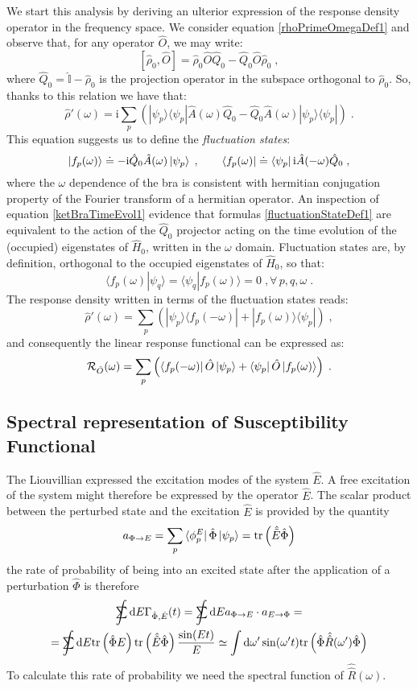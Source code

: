 \documentclass[a4paper]{article}
\newcommand{\dd}{{\rm d}}
\newcommand{\ii}{\mathrm{i}}
\newcommand{\sint}{\mathrlap{\displaystyle\int}
\mathrlap{\textstyle\sum}
\phantom{\mathrlap{\displaystyle
\int}\textstyle\sum}}
\newcommand{\be}{\begin{equation}}
\newcommand{\ee}{\end{equation}}
\newcommand{\qq}{\qquad}
\newcommand{\lb}{\label}
\newcommand{\op}[1]{\hat {#1}}
\newcommand{\sop}[1]{\op{\op {#1}}}
\newcommand{\commutator}[2]{\left[ {#1} , {#2} \right]}
\newcommand{\trace}[1]{\mathrm{tr}\left(#1\right)}
\newcommand{\brket}[2]{\langle  #1 | #2 \rangle} %
\newcommand{\ketbra}[2]{| #1 \rangle \langle #2 |}
\newcommand{\dmnot}{\op{\rho}_0}
\newcommand{\dm}{\op{\rho}}
\newcommand{\hnot}{\op{H}_0}
\newcommand{\identity}{\op{\mathbb I}}
\begin{document}
We start this analysis by deriving an ulterior expression of the response density operator in the frequency space. We consider equation \eqref{rhoPrimeOmegaDef1} and observe that, for any 
operator $\op O$, we may write:  
\be
\commutator{\dmnot}{\op O} = \dmnot \op O \op Q_0 - \op Q_0 \op O \dmnot\;,
\ee
where $\op Q_0= \identity - \dmnot$ is the projection operator in the subspace orthogonal to $\dmnot$. So, thanks to this relation we have that:
\be
\dm'(\omega) = \ii\sum_p\left(\ketbra{\psi_p}{\psi_p}\op A(\omega)\op Q_0 - \op Q_0\op A(\omega)\ketbra{\psi_p}{\psi_p}\right) \;.
\ee
This equation suggests us to define the \emph{fluctuation states}:
\be\lb{fluctuationStateDef1}
\ket{f_p(\omega)} \doteq -\ii\op Q_0\op A(\omega)\ket{\psi_p} \;, \qq
\bra{f_p(\omega)} \doteq \bra{\psi_p}\ii\op A(-\omega)\op Q_0 \;,
\ee
where the $\omega$ dependence of the bra is consistent with hermitian conjugation property of the Fourier transform of a hermitian operator. An inspection of equation \eqref{ketBraTimeEvol1} 
evidence that formulas \eqref{fluctuationStateDef1} are equivalent to the action of the $\op Q_0$ projector acting on the time evolution of the (occupied) eigenstates of $\hnot$, written 
in the $\omega$ domain. Fluctuation states are, by definition, orthogonal to the occupied eigenstates of $\hnot$, so that:
\be
\brket{f_p(\omega)}{\psi_q} = \brket{\psi_q}{f_p(\omega)} = 0 \;, \forall \, p,q,\omega \;.
\ee
The response density written in terms of the fluctuation states reads:
\be\lb{rhoPrimeFluctuationStateDef1}
\dm'(\omega) = \sum_p\left(\ketbra{\psi_p}{f_p(-\omega)} + \ketbra{f_p(\omega)}{\psi_p}\right) \;,
\ee
and consequently the linear response functional can be expressed as:
\be\lb{LinearResponseFunctDef2}
{\cal R}_{\op O}(\omega) = 
\sum_p\left(\bra{f_p(-\omega)}\op O\ket{\psi_p} + \bra{\psi_p}\op O\ket{f_p(\omega)}\right) \;.
\ee

\subsection{Spectral representation of Susceptibility Functional}
The Liouvillian expressed the excitation modes of the system $\op E$.
A free excitation of the system might therefore be expressed by the operator $\op E$.
The scalar product between the perturbed state and the excitation $\op E$ is provided by the quantity
\be
a_{\Phi \rightarrow E} = \sum_p \bra{\phi_p^E} \op \Phi \ket{\psi_p} = \trace{\op{\tilde E} \op \Phi}
\ee
the rate of probability of being into an excited state after the application of a perturbation $\op \Phi$ is therefore
\begin{multline}
\sint \dd E\Gamma_{\op\Phi, \op E}(t) = \sint \dd E a_{\Phi \rightarrow E} \cdot a_{E \rightarrow \Phi} = \\=  \sint \dd E \trace{\op \Phi E } \trace{ \op{\tilde E} \op \Phi} \frac{\sin(E t)}{E}
\simeq \int \dd \omega' \sin(\omega' t) \trace{\op \Phi \sop R(\omega')\op \Phi}
\end{multline}
To calculate this rate of probability we need the spectral function of $\sop R(\omega)$.
\end{document}
